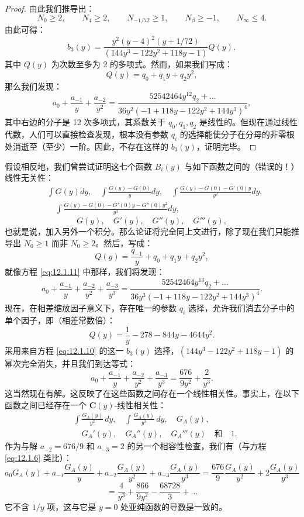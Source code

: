 \begin{proof}
由此我们推导出：
\begin{equation}\label{eq:12.1.9}\tag{12.1.9}
N_{0} \ge 2, \qquad N_{4} \ge 2, \qquad N_{-1/72} \ge 1, \qquad N_{\beta} \ge -1, \qquad N_{\infty} \le 4.
\end{equation}
由此可得：
\begin{equation}\label{eq:12.1.10}\tag{12.1.10}
b_3(y) = \frac{y^2(y-4)^2(y+1/72)}{(144y^3 - 122y^2 + 118y - 1)}Q(y),
\end{equation}
其中 $Q(y)$ 为次数至多为 2 的多项式。然而，如果我们写成：
\[ Q(y) = q_0 + q_1 y + q_2 y^2, \]
那么我们发现：
\begin{equation}\label{eq:12.1.11}\tag{12.1.11}
a_0 + \frac{a_{-1}}{y} + \frac{a_{-2}}{y^2} = \frac{52542464y^{12}q_2 + \dots}{36y^2(-1 + 118y - 122y^2 + 144y^3)^4},
\end{equation}
其中右边的分子是 12 次多项式，其系数关于 $q_0, q_1, q_2$ 是线性的。但现在通过线性代数，人们可以直接检查发现，根本没有参数 $q_i$ 的选择能使分子在分母的非零根处消逝至（至少）一阶。因此，不存在这样的 $b_3(y)$，证明完毕。
\end{proof}

\begin{remark}\label{rem:12.1.12}
假设相反地，我们曾尝试证明这七个函数 $B_i(y)$ 与如下函数之间的（错误的！）线性无关性：
\[
\begin{aligned}
&\int G(y) dy, \quad \int \frac{G(y)-G(0)}{y}dy, \quad \int \frac{G(y)-G(0)-G'(0)y}{y^{2}}dy, \\
&\quad \int \frac{G(y)-G(0)-G'(0)y-G''(0)y^{2}}{y^{3}}dy,
\end{aligned}
\]
\[ G(y), \quad G'(y), \quad G''(y), \quad G'''(y), \]
也就是说，加入另外一个积分。那么论证将完全同上文进行，除了现在我们只能推导出 $N_0 \ge 1$ 而非 $N_0 \ge 2$。然后，写成：
\[ Q(y) = \frac{q_{-1}}{y} + q_0 + q_1 y + q_2 y^2, \]
就像方程 \eqref{eq:12.1.11} 中那样，我们将发现：
\[ a_0 + \frac{a_{-1}}{y} + \frac{a_{-2}}{y^2} + \frac{a_{-3}}{y^3} = \frac{52542464y^{13}q_2 + \dots}{36y^3(-1 + 118y - 122y^2 + 144y^3)^4}. \]
现在，在相差缩放因子意义下，存在唯一的参数 $q_i$ 选择，允许我们消去分子中的单个因子，即（相差常数倍）：
\[ Q(y) = \frac{1}{y} - 278 - 844y - 4644y^{2}. \]
采用来自方程 \eqref{eq:12.1.10} 的这一 $b_3(y)$ 选择，$(144y^3 - 122y^2 + 118y - 1)$ 的幂次完全消失，并且我们到达等式：
\[ a_0 + \frac{a_{-1}}{y} + \frac{a_{-2}}{y^2} + \frac{a_{-3}}{y^3} = \frac{676}{9y^2} + \frac{2}{y^3}. \]
这当然现在有解。这反映了在这些函数之间存在一个线性相关性。事实上，在以下函数之间已经存在一个 $\mathbf{C}(y)$-线性相关性：
\[
\begin{aligned}
& \int \frac{G_A(y)}{y^2} \, dy, \quad \int \frac{G_A(y)}{y^3} \, dy, \quad G_A(y), \\
& \quad G_A'(y), \quad G_A''(y), \quad G_A'''(y) \quad \text{和} \quad 1.
\end{aligned}
\]
作为与解 $a_{-2} = 676/9$ 和 $a_{-3} = 2$ 的另一个相容性检查，我们有（与方程 \eqref{eq:12.1.6} 类比）：
\[ a_0 G_A(y) + a_{-1} \frac{G_A(y)}{y} + a_{-2} \frac{G_A(y)}{y^2} + a_{-3} \frac{G_A(y)}{y^3} = \frac{676}{9} \frac{G_A(y)}{y^2} + 2 \frac{G_A(y)}{y^3} \]
\[ = \frac{4}{y^3} + \frac{866}{9y^2} - \frac{68728}{3} + \dots \]
它不含 $1/y$ 项，这与它是 $y = 0$ 处亚纯函数的导数是一致的。
\end{remark}
